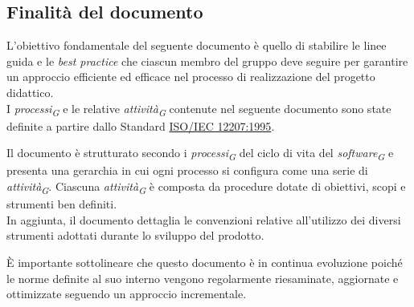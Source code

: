 \subsection{Finalità del documento}
L'obiettivo fondamentale del seguente documento è quello di stabilire le linee guida e le \textit{best practice} che ciascun membro del gruppo deve seguire per garantire un approccio efficiente ed efficace nel processo di realizzazione del progetto didattico.\\
I \textit{processi}\textsubscript{\textit{G}} e le relative \textit{attività}\textsubscript{\textit{G}} contenute nel seguente documento sono state definite a partire dallo Standard \href{https://www.math.unipd.it/~tullio/IS-1/2009/Approfondimenti/ISO_12207-1995.pdf}{ISO/IEC 12207:1995}.

\vspace{0.2cm}

Il documento è strutturato secondo i \textit{processi}\textsubscript{\textit{G}} del ciclo di vita del \textit{software}\textsubscript{\textit{G}} e presenta una gerarchia in cui ogni processo si configura come una serie di \textit{attività}\textsubscript{\textit{G}}. Ciascuna \textit{attività}\textsubscript{\textit{G}} è composta da procedure dotate di obiettivi, scopi e strumenti ben definiti.\\
In aggiunta, il documento dettaglia le convenzioni relative all'utilizzo dei diversi strumenti adottati durante lo sviluppo del prodotto.

\vspace{0.2cm}

È importante sottolineare che questo documento è in continua evoluzione poiché le norme definite al suo interno vengono regolarmente riesaminate, aggiornate e ottimizzate seguendo un approccio incrementale.\\
